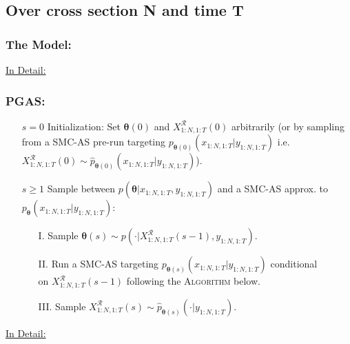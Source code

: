 \documentclass[a4paper,12pt]{scrartcl} %
\newcommand{\given}{\lvert}
\newcommand{\seqnN}{{1:N}}
\newcommand{\seqtT}{{1:T}}
\newcommand{\rt}{\boldsymbol{\theta}}
\newcommand{\p}{p_{\rt}}
\begin{document}
\subsection{Over cross section N and time T}
\subsubsection{The Model:}
\clearpage
\underline{In Detail:}
\clearpage
\subsubsection{PGAS:}
\begin{itemize}
\item[$s=0$] Initialization: Set $\rt(0)$ and $X_{\seqnN,\seqtT}^{\mathcal{R}}(0)$ arbitrarily (or by sampling from a SMC-AS pre-run targeting $p_{\rt(0)}(x_{\seqnN,\seqtT}\given y_{\seqnN,\seqtT})$ i.e. $X_{\seqnN,\seqtT}^{\mathcal{R}}(0)\sim \widehat{p}_{\rt(0)}(x_{\seqnN,\seqtT}\given y_{\seqnN,\seqtT})$).
\item[$s\geq 1$] Sample between $p
(\rt\given x_{\seqnN,\seqtT},y_{\seqnN,\seqtT})$ and a SMC-AS  
approx. to $\p(x_{\seqnN,\seqtT}\given y_{\seqnN,\seqtT})$:
\begin{itemize}
\item[I.] Sample $\rt(s)\sim p
(\cdot\given X_{\seqnN,\seqtT}^{\mathcal{R}}(s-1),y_{\seqnN,\seqtT})$\;.
\item[II.] Run a SMC-AS targeting
$p_{\rt(s)}(x_{\seqnN,\seqtT}\given y_{\seqnN,\seqtT})$ conditional \\on $X_{\seqnN,\seqtT}^{\mathcal{R}}(s-1)$ following the  \textsc{Algorithm} below\;.
\item[III.] Sample $X_{\seqnN,\seqtT}^{\mathcal{R}}(s)\sim\widehat{p}_{\rt(s)}(\cdot\given y_{\seqnN,\seqtT})$\;.
\end{itemize}
\end{itemize}
\clearpage
\underline{In Detail:}
\clearpage
\end{document}
